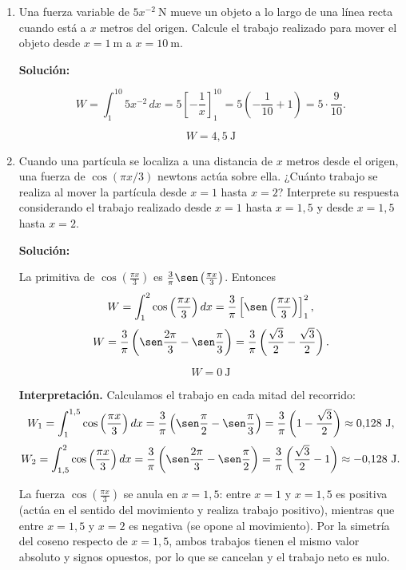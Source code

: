\documentclass[12pt]{article}
\newcommand{\solucion}{%
    \vspace{0.8em}%
    \textbf{Solución:}%
}
\begin{document}
\begin{enumerate}[label=\alph*.-]

    \item Una fuerza variable de $5x^{-2}\ \text{N}$ mueve un objeto a
    lo largo de una línea recta cuando está a $x$ metros del origen.
    Calcule el trabajo realizado para mover el objeto desde $x=1\ \text{m}$
    a $x=10\ \text{m}$.

    \solucion

    \[
    W=\int_{1}^{10}5x^{-2}\,dx
    =5\left[-\frac1x\right]_{1}^{10}
    =5\left(-\frac{1}{10}+1\right)
    =5\cdot\frac{9}{10}.
    \]

    \[
    \boxed{
    W=4{,}5\ \text{J}
    }
    \]


    \item Cuando una partícula se localiza a una distancia de $x$ metros
    desde el origen, una fuerza de $\cos(\pi x/3)$ newtons actúa sobre
    ella. ¿Cuánto trabajo se realiza al mover la partícula desde $x=1$
    hasta $x=2$? Interprete su respuesta considerando el trabajo
    realizado desde $x=1$ hasta $x=1{,}5$ y desde $x=1{,}5$ hasta $x=2$.

    \solucion

    La primitiva de $\cos\left(\frac{\pi x}{3}\right)$ es
    $\frac3\pi\sen\left(\frac{\pi x}{3}\right)$. Entonces
    \[
    W=\int_{1}^{2}\cos\left(\frac{\pi x}{3}\right)dx
    =\frac3\pi\left[\sen\left(\frac{\pi x}{3}\right)\right]_{1}^{2},
    \]
    \[
    W=\frac3\pi\left(\sen\frac{2\pi}{3}-\sen\frac\pi3\right)
    =\frac3\pi\left(\frac{\sqrt3}{2}-\frac{\sqrt3}{2}\right).
    \]

    \[
    \boxed{
    W=0\ \text{J}
    }
    \]

    \textbf{Interpretación.} Calculamos el trabajo en cada mitad del
    recorrido:
    \[
    W_1=\int_{1}^{1{,}5}\cos\left(\frac{\pi x}{3}\right)dx
    =\frac3\pi\left(\sen\frac\pi2-\sen\frac\pi3\right)
    =\frac3\pi\left(1-\frac{\sqrt3}{2}\right)\approx0{,}128\ \text{J},
    \]
    \[
    W_2=\int_{1{,}5}^{2}\cos\left(\frac{\pi x}{3}\right)dx
    =\frac3\pi\left(\sen\frac{2\pi}{3}-\sen\frac\pi2\right)
    =\frac3\pi\left(\frac{\sqrt3}{2}-1\right)\approx-0{,}128\ \text{J}.
    \]

    La fuerza $\cos\left(\frac{\pi x}{3}\right)$ se anula en $x=1{,}5$:
    entre $x=1$ y $x=1{,}5$ es positiva (actúa en el sentido del
    movimiento y realiza trabajo positivo), mientras que entre $x=1{,}5$
    y $x=2$ es negativa (se opone al movimiento). Por la simetría del
    coseno respecto de $x=1{,}5$, ambos trabajos tienen el mismo valor
    absoluto y signos opuestos, por lo que se cancelan y el trabajo
    neto es nulo.



\end{enumerate}
\end{document}
